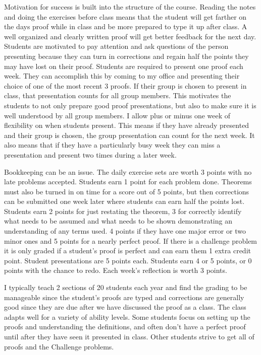\begin{annotation}
Motivation for success is built into the structure of the course. Reading the notes and doing the exercises before class means that the student will get farther on the days proof while in class and be more prepared to type it up after class. A well organized and clearly written proof will get better feedback for the next day. Students are motivated to pay attention and ask questions of the person presenting because they can turn in corrections and regain half the points they may have lost on their proof. Students are required to present one proof each week. They can accomplish this by coming to my office and presenting their choice of one of the most recent 3 proofs. If their group is chosen to present in class, that presentation counts for all group members. This motivates the students to not only prepare good proof presentations, but also to make sure it is well understood by all group members. I allow plus or minus one week of flexibility on when students present. This means if they have already presented and their group is chosen, the group presentation can count for the next week. It also means that if they have a particularly busy week they can miss a presentation and present two times during a later week.

Bookkeeping can be an issue. The daily exercise sets are worth 3 points with no late problems accepted. Students earn 1 point for each problem done. Theorems must also be turned in on time for a score out of 5 points, but then corrections can be submitted one week later where students can earn half the points lost. Students earn 2 points for just restating the theorem, 3 for correctly identify what needs to be assumed and what needs to be shown demonstrating an understanding of any terms used. 4 points if they have one major error or two minor ones and 5 points for a nearly perfect proof. If there is a challenge problem it is only graded if a student's proof is perfect and can earn them 1 extra credit point. Student presentations are 5 points each. Students earn 4 or 5 points, or 0 points with the chance to redo. Each week's reflection is worth 3 points.  

I typically teach 2 sections of 20 students each year and find the grading to be manageable since the student's proofs are typed and corrections are generally good since they are due after we have discussed the proof as a class. The class adapts well for a variety of ability levels. Some students focus on setting up the proofs and understanding the definitions, and often don't have a perfect proof until after they have seen it presented in class. Other students strive to get all of proofs and the Challenge problems. 


\end{annotation}

